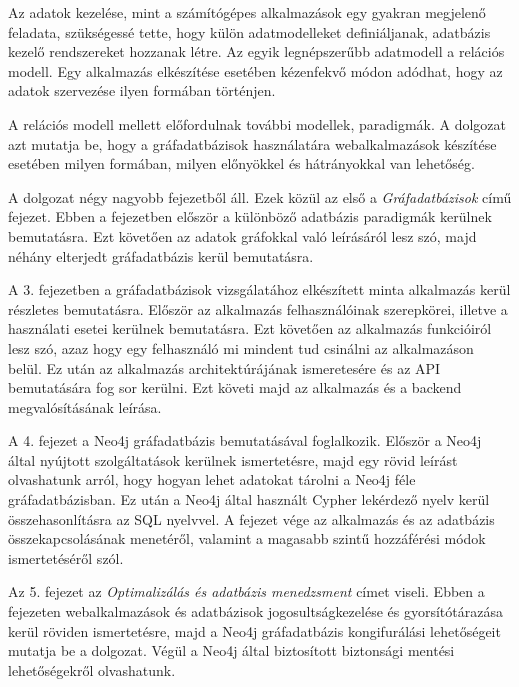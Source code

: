 
Az adatok kezelése, mint a számítógépes alkalmazások egy gyakran megjelenő feladata, szükségessé tette, hogy  külön adatmodelleket definiáljanak, adatbázis kezelő rendszereket hozzanak létre.
Az egyik legnépszerűbb adatmodell a relációs modell. Egy alkalmazás elkészítése esetében kézenfekvő módon adódhat, hogy az adatok szervezése ilyen formában történjen.

A relációs modell mellett előfordulnak további modellek, paradigmák. A dolgozat azt mutatja be, hogy a gráfadatbázisok használatára webalkalmazások készítése esetében milyen formában, milyen előnyökkel és hátrányokkal van lehetőség.

A dolgozat négy nagyobb fejezetből áll. Ezek közül az első a \textit{Gráfadatbázisok} című fejezet.
Ebben a fejezetben először a különböző adatbázis paradigmák kerülnek bemutatásra. Ezt követően az adatok gráfokkal való leírásáról lesz szó, majd néhány elterjedt gráfadatbázis kerül bemutatásra.

A 3. fejezetben a gráfadatbázisok vizsgálatához elkészített minta alkalmazás kerül részletes bemutatásra. Először az alkalmazás felhasználóinak szerepkörei, illetve a használati esetei kerülnek bemutatásra. Ezt követően az alkalmazás funkcióiról lesz szó, azaz hogy egy felhasználó mi mindent tud csinálni az alkalmazáson belül. Ez után az alkalmazás architektúrájának ismeretesére és az API bemutatására fog sor kerülni. Ezt követi majd az alkalmazás és a backend megvalósításának leírása.

A 4. fejezet a Neo4j gráfadatbázis bemutatásával foglalkozik. Először a Neo4j által nyújtott szolgáltatások kerülnek ismertetésre, majd egy rövid leírást olvashatunk arról, hogy hogyan lehet adatokat tárolni a Neo4j féle gráfadatbázisban. Ez után a Neo4j által használt Cypher lekérdező nyelv kerül összehasonlításra az SQL nyelvvel. A fejezet vége az alkalmazás és az adatbázis összekapcsolásának menetéről, valamint a magasabb szintű hozzáférési módok ismertetéséről szól.

Az 5. fejezet az \textit{Optimalizálás és adatbázis menedzsment} címet viseli. Ebben a fejezeten webalkalmazások és adatbázisok jogosultságkezelése és gyorsítótárazása kerül röviden ismertetésre, majd a Neo4j gráfadatbázis kongifurálási lehetőségeit mutatja be a dolgozat. Végül a Neo4j által biztosított biztonsági mentési lehetőségekről olvashatunk.
